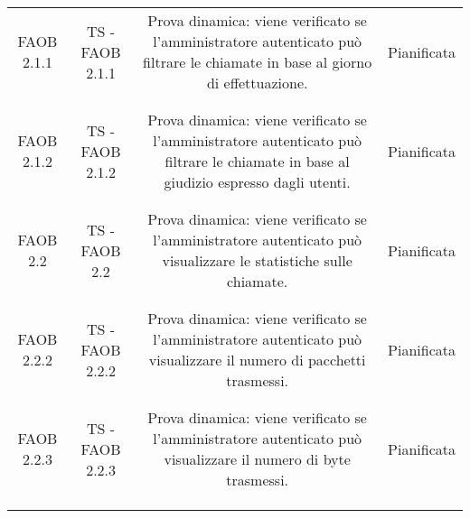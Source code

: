 {{\begin{table}[h!]
\begin{center}
\begin{minipage}{1\linewidth}
\begin{tabular}{c c c c}
						FAOB 2.1.1
						&
						TS - FAOB 2.1.1			
						& 
						\begin{minipage}{0.55\linewidth}
							Prova dinamica: viene verificato se l'amministratore autenticato
							può filtrare le chiamate in base al giorno di effettuazione.
						\end{minipage}	
						&
						Pianificata
						\\
						\\
						\bottomrule
						\\
						FAOB 2.1.2
						&
						TS - FAOB 2.1.2			
						& 
						\begin{minipage}{0.55\linewidth}
							Prova dinamica: viene verificato se l'amministratore autenticato
							può filtrare le chiamate in base al giudizio espresso dagli
							utenti.
						\end{minipage}	
						&
						Pianificata
						\\
						\\
						\bottomrule
						\\
						FAOB 2.2
						&
						TS - FAOB 2.2			
						& 
						\begin{minipage}{0.55\linewidth}
							Prova dinamica: viene verificato se l'amministratore
							autenticato può visualizzare le statistiche sulle chiamate.
						\end{minipage}	
						&
						Pianificata
						\\
						\\
						\bottomrule
						\\
						FAOB 2.2.2
						&
						TS - FAOB 2.2.2			
						& 
						\begin{minipage}{0.55\linewidth}
							Prova dinamica: viene verificato se l'amministratore 
							autenticato può visualizzare il numero di pacchetti trasmessi.
						\end{minipage}	
						&
						Pianificata
						\\
						\\
						\bottomrule
						\\
						FAOB 2.2.3
						&
						TS - FAOB 2.2.3 			
						& 
						\begin{minipage}{0.55\linewidth}
							Prova dinamica: viene verificato se l'amministratore 
							autenticato può visualizzare il numero di byte trasmessi.
						\end{minipage}	
						&
						Pianificata
						\\
						\\
						\bottomrule
						\\\\

\end{tabular}
\end{minipage}
\end{center}
\end{table}}}
